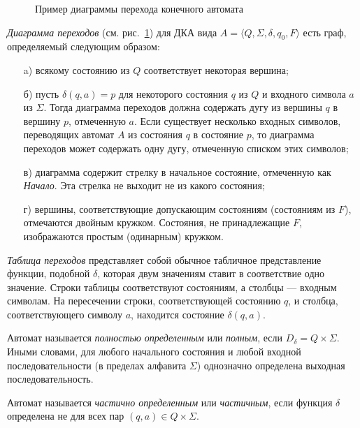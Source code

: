 \begin{figure}[ht]
\caption[Пример диаграммы перехода конечного автомата]{Пример диаграммы перехода конечного автомата}
\label{pic:auto}
\end{figure}

\textit{Диаграмма переходов} (см. рис.~\ref{pic:auto}) для ДКА вида $A = \langle Q, \Sigma, \delta, q_0, F  \rangle$ есть граф, определяемый следующим образом:
\begin{itemize}
 \item [a)] всякому состоянию из $Q$ соответствует некоторая вершина;
 \item [б)] пусть $\delta(q, a) = p$ для некоторого состояния $q$ из $Q$ и входного символа $a$ из $\Sigma$.
 Тогда диаграмма переходов должна содержать дугу из вершины $q$ в вершину $p$, отмеченную $a$.
 Если существует несколько входных символов, переводящих автомат $A$ из состояния $q$ в состояние $p$, то диаграмма переходов может содержать одну дугу, отмеченную списком этих символов;
 \item [в)] диаграмма содержит стрелку в начальное состояние, отмеченную как \textit{Начало}.
 Эта стрелка не выходит не из какого состояния;
 \item [г)] вершины, соответствующие допускающим состояниям (состояниям из $F$), отмечаются двойным кружком.
 Состояния, не принадлежащие $F$, изображаются простым (одинарным) кружком.
\end{itemize}


\textit{Таблица переходов} представляет собой обычное табличное представление функции, подобной $\delta$, которая двум значениям ставит в соответствие одно значение.
Строки таблицы соответствуют состояниям, а столбцы --- входным символам.
На пересечении строки, соответствующей состоянию $q$, и столбца, соответствующего символу $a$, находится состояние $\delta(q, a)$. 
\cite{Intro-TA}

\begin{Def}
Автомат называется \textit{полностью определенным} или \textit{полным}, если $D_\delta = Q \times \Sigma$.
Иными словами, для любого начального состояния и любой входной последовательности (в пределах алфавита $\Sigma$) однозначно определена выходная последовательность.
\end{Def}

\begin{Def}
Автомат называется \textit{частично определенным} или \textit{частичным}, если функция $\delta$ определена не для всех пар $(q, a) \in Q \times \Sigma$. 
\end{Def}

